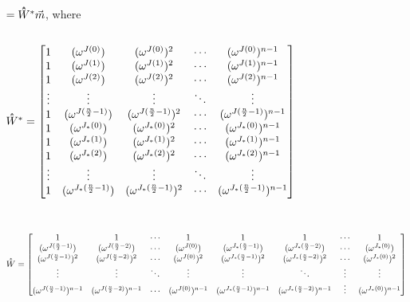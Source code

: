 $ $

$ = \hathat{W}^* \vec{m} $, where 

$ $

\noindent $\hathat{W}^* = \begin{bmatrix}
1 & (\omega^{J(0)}) & (\omega^{J(0)})^2 & \cdots & (\omega^{J(0)})^{n-1}\\
1 & (\omega^{J(1)}) & (\omega^{J(1)})^2 & \cdots & (\omega^{J(1)})^{n-1}\\
1 & (\omega^{J(2)}) & (\omega^{J(2)})^2 & \cdots & (\omega^{J(2)})^{n-1}\\
\vdots & \vdots & \vdots & \ddots & \vdots \\
1 & (\omega^{J(\frac{n}{2}-1)}) & (\omega^{J(\frac{n}{2}-1)})^2 & \cdots & (\omega^{J(\frac{n}{2}-1)})^{n-1}\\
1 & (\omega^{J_*(0)}) & (\omega^{J_*(0)})^2 & \cdots & (\omega^{J_*(0)})^{n-1}\\
1 & (\omega^{J_*(1)}) & (\omega^{J_*(1)})^2 & \cdots & (\omega^{J_*(1)})^{n-1}\\
1 & (\omega^{J_*(2)}) & (\omega^{J_*(2)})^2 & \cdots & (\omega^{J_*(2)})^{n-1}\\
\vdots & \vdots & \vdots & \ddots & \vdots \\
1 & (\omega^{J_*(\frac{n}{2}-1)}) & (\omega^{J_*(\frac{n}{2}-1)})^2 & \cdots & (\omega^{J_*(\frac{n}{2}-1)})^{n-1}\\
\end{bmatrix}$

$ $

$ $

\noindent $\hathat{W} = \begin{bmatrix}
1 & 1 & \cdots & 1 & 1 & 1 & \cdots & 1\\
(\omega^{J(\frac{n}{2} - 1)}) & (\omega^{J(\frac{n}{2} - 2)}) & \cdots & (\omega^{J(0)}) & (\omega^{J_*(\frac{n}{2} - 1)}) & (\omega^{J_*(\frac{n}{2} - 2)}) & \cdots & (\omega^{J_*(0)})\\
(\omega^{J(\frac{n}{2} - 1)})^2 & (\omega^{J(\frac{n}{2} - 2)})^2 & \cdots & (\omega^{J(0)})^2 & (\omega^{J_*(\frac{n}{2} - 1)})^2 & (\omega^{J_*(\frac{n}{2} - 2)})^2 & \cdots & (\omega^{J_*(0)})^2 \\
\vdots & \vdots & \ddots & \vdots & \vdots & \ddots & \vdots & \vdots \\
(\omega^{J(\frac{n}{2} - 1)})^{n-1} & (\omega^{J(\frac{n}{2} - 2)})^{n-1} & \cdots & (\omega^{J(0)})^{n-1} & (\omega^{J_*(\frac{n}{2} - 1)})^{n-1} & (\omega^{J_*(\frac{n}{2} - 2)})^{n-1} & \vdots  & (\omega^{J_*(0)})^{n-1}
\end{bmatrix}$

